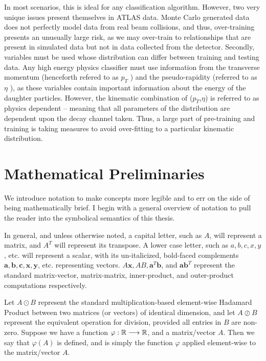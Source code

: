 In most scenarios, this is ideal for any classification algorithm. However, two very unique issues present themselves in ATLAS data. Monte Carlo generated data does not perfectly model data from real beam collisions, and thus, over-training presents an unusually large risk, as we may over-train to relationships that are present in simulated data but not in data collected from the detector. Secondly, variables must be used whose distribution can differ between training and testing data. Any high energy physics classifier must use information from the transverse momentum (henceforth refered to as $p_{T}$
 ) and the pseudo-rapidity (referred to as $\eta$
 ), as these variables contain important information about the energy of the daughter particles. However, the kinematic combination of ($p_{T}$,$\eta$)
  is referred to as physics dependent -- meaning that all parameters of the distribution are dependent upon the decay channel taken. Thus, a large part of pre-training and training is taking measures to avoid over-fitting to a particular kinematic distribution.
  
\section{Mathematical Preliminaries}
We introduce notation to make concepts more legible and to err on the side of being mathematically brief. I begin with a general overview of notation to pull the reader into the symbolical semantics of this thesis. 

In general, and unless otherwise noted, a capital letter, such as $A$, will represent a matrix, and $A^T$ will represent its transpose. A lower case letter, such as $a,b,c,x,y$, etc. will represent a scalar, with its un-italicized, bold-faced complements $\mathbf{a},\mathbf{b},\mathbf{c},\mathbf{x},\mathbf{y}$, etc. representing vectors. $A\mathbf{x}, AB, \mathbf{a}^T \mathbf{b}$, and $\mathbf{a} \mathbf{b}^T$ represent the standard matrix-vector, matrix-matrix, inner-product, and outer-product computations respectively.

Let $A\odot B$ represent the standard multiplication-based element-wise Hadamard Product between two matrices (or vectors) of identical dimension, and let $A\oslash B$ represent the equivalent operation for division, provided all entries in $B$ are non-zero. Suppose we have a function $\varphi : \mathbb{R} \longrightarrow \mathbb{R}$, and a matrix/vector $A$. Then we say that $\varphi(A)$ is defined, and is simply the function $\varphi$ applied element-wise to the matrix/vector $A$.

